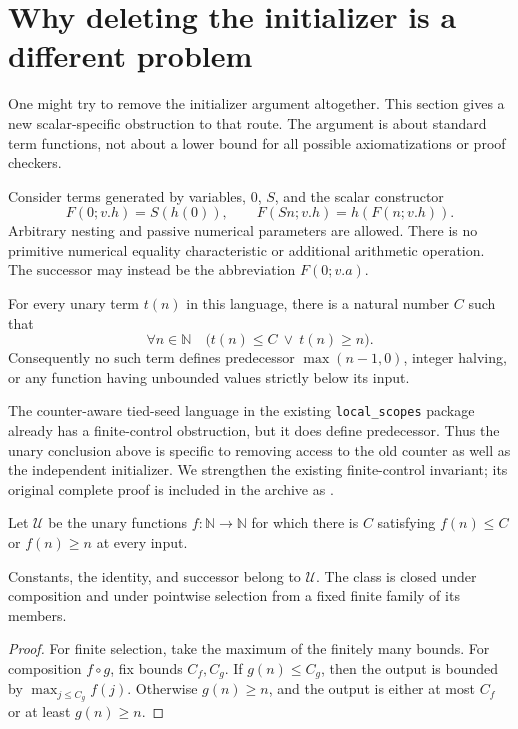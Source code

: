 \section{Why deleting the initializer is a different problem}
\label{sec:scalar-obstruction}

One might try to remove the initializer argument altogether. This section
gives a new scalar-specific obstruction to that route. The argument is about
standard term functions, not about a lower bound for all possible
axiomatizations or proof checkers.

Consider terms generated by variables, $0$, $S$, and the scalar constructor
\[
 F(0;v.h)=S(h(0)),\qquad
 F(Sn;v.h)=h(F(n;v.h)).
\]
Arbitrary nesting and passive numerical parameters are allowed. There is no
primitive numerical equality characteristic or additional arithmetic
operation. The successor may instead be the abbreviation $F(0;v.a)$.

\begin{theorem}
\label{thm:unary-bound}
For every unary term $t(n)$ in this language, there is a natural number $C$
such that
\[
 \forall n\in\mathbb N\quad
       \bigl(t(n)\leq C\ \lor\ t(n)\geq n\bigr).
\]
Consequently no such term defines predecessor $\max(n-1,0)$, integer
halving, or any function having unbounded values strictly below its input.
\end{theorem}

The counter-aware tied-seed language in the existing
\texttt{local\_scopes} package already has a finite-control obstruction, but
it does define predecessor. Thus the unary conclusion above is specific to
removing access to the old counter as well as the independent initializer.
We strengthen the existing finite-control invariant; its original complete
proof is included in the archive as
.

\begin{definition}
Let $\mathcal U$ be the unary functions $f:\mathbb N\to\mathbb N$ for which
there is $C$ satisfying $f(n)\leq C$ or $f(n)\geq n$ at every input.
\end{definition}

\begin{lemma}
Constants, the identity, and successor belong to $\mathcal U$. The class is
closed under composition and under pointwise selection from a fixed finite
family of its members.
\end{lemma}
\begin{proof}
For finite selection, take the maximum of the finitely many bounds. For
composition $f\circ g$, fix bounds $C_f,C_g$. If $g(n)\leq C_g$, then the
output is bounded by $\max_{j\leq C_g}f(j)$. Otherwise $g(n)\geq n$, and
the output is either at most $C_f$ or at least $g(n)\geq n$.
\end{proof}

